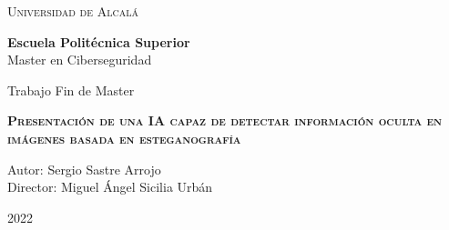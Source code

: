 \setcounter{page}{0}

\begin{center}
\LARGE \textsc{Universidad de Alcalá}\\
\vspace{0.5cm}

\textbf{Escuela Politécnica Superior}\\

Master en Ciberseguridad
\end{center}

\vspace{0.5cm}


\begin{center}
\end{center}


\begin{center}
\vspace{1cm}

\LARGE Trabajo Fin de Master\\

\vspace{0.5cm}

\textbf{\Huge \textsc{{Presentación de una IA capaz de detectar información oculta en imágenes basada en esteganografía}}}\\

\vspace{1.5cm}

\large Autor: Sergio Sastre Arrojo\\
Director: Miguel Ángel Sicilia Urbán\\

\vspace{1.5cm}

\large 2022\\
\end{center}


